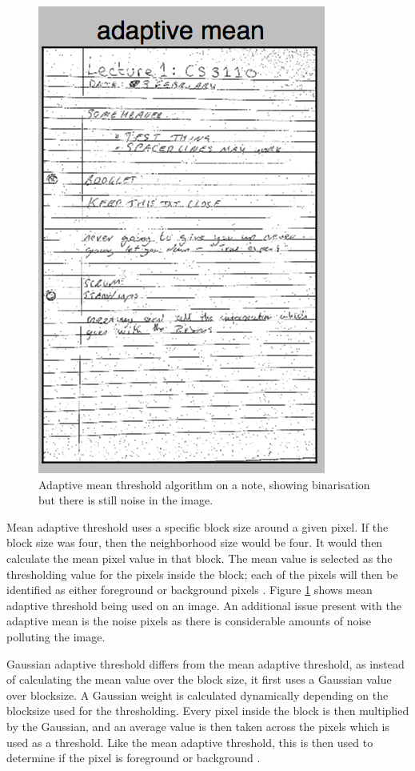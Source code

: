 \begin{figure}[H]
  \centering
  \includegraphics{images/adaptive_mean}
  \caption{Adaptive mean threshold algorithm on a note, showing binarisation but there is still noise in the image.}
  \label{fig:adaptive_mean}
\end{figure}

Mean adaptive threshold uses a specific block size around a given pixel. If the block size was four, then the neighborhood size would be four. It would then calculate the mean pixel value in that block. The mean value is selected as the thresholding value for the pixels inside the block; each of the pixels will then be identified as either foreground or background pixels \cite{citeulike:14021401}. Figure \ref{fig:adaptive_mean} shows mean adaptive threshold being used on an image. An additional issue present with the adaptive mean is the noise pixels as there is considerable amounts of noise polluting the image.

Gaussian adaptive threshold differs from the mean adaptive threshold, as instead of calculating the mean value over the block size, it first uses a Gaussian value over blocksize. A Gaussian weight is calculated dynamically depending on the blocksize used for the thresholding. Every pixel inside the block is then multiplied by the Gaussian, and an average value is then taken across the pixels which is used as a threshold. Like the mean adaptive threshold, this is then used to determine if the pixel is foreground or background \cite{bradski2008learning}\cite{citeulike:14021401}.


